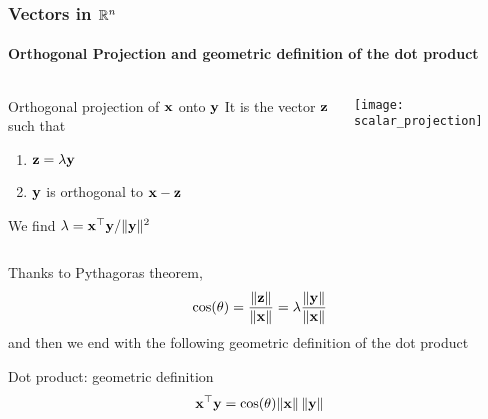 \begin{frame}
  \frametitle{Vectors in $\mathbb{R}^n$}
  \framesubtitle{Orthogonal Projection and geometric definition of the dot product}

  \begin{columns}
  \begin{column}{.5\textwidth}
  \begin{block}{Orthogonal projection of $\mathbf{x}$ onto $\mathbf{y}$}
    It is the vector $\mathbf{z}$ such that
  \begin{enumerate}
    \item $\mathbf{z} = \lambda \mathbf{y}$
    \item $\mathbf{y}$  is orthogonal to $\mathbf{x} - \mathbf{z}$
  \end{enumerate}
    We find $\lambda =\mathbf{x}^\top \mathbf{y} / \|\mathbf{y} \|^2 $ 
  \end{block}
  \end{column}
  \begin{column}{.5\textwidth}
    \texttt{[image: scalar\_projection]}
  \end{column}
  \end{columns}

  \pause
  Thanks to Pythagoras theorem, 
  \begin{equation*}
    \cos(\theta) = \frac{\|\mathbf{z}\|}{\|\mathbf{x}\|} = \lambda \frac{\|\mathbf{y}\|}{\|\mathbf{x}\|}
  \end{equation*}
  and then we end with the following geometric definition of the dot product
  
  \begin{block}{Dot product: geometric definition} 
  \vspace{-.35cm}
    \begin{equation*}
      \mathbf{x}^\top \mathbf{y} = \cos (\theta) \| \mathbf{x} \| \,  \| \mathbf{y} \| 
    \end{equation*}
  \end{block}


\end{frame}

